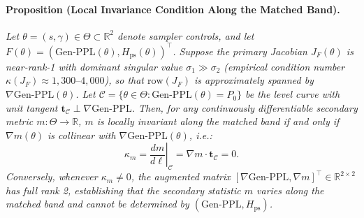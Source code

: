 \documentclass[11pt,a4paper]{article}
\begin{document}
\paragraph{Proposition (Local Invariance Condition Along the Matched Band).}
\emph{Let $\theta = (s, \gamma) \in \Theta \subset \mathbb{R}^2$ denote sampler controls, and let $F(\theta) = (\mathrm{Gen\text{-}PPL}(\theta), H_{\mathrm{ps}}(\theta))^\top$. Suppose the primary Jacobian $J_F(\theta)$ is near-rank-1 with dominant singular value $\sigma_1 \gg \sigma_2$ (empirical condition number $\kappa(J_F) \approx 1{,}300\text{--}4{,}000$), so that $\mathrm{row}(J_F)$ is approximately spanned by $\nabla \mathrm{Gen\text{-}PPL}(\theta)$. Let $\mathcal{C} = \{\theta \in \Theta : \mathrm{Gen\text{-}PPL}(\theta) = P_0\}$ be the level curve with unit tangent $\mathbf{t}_{\mathcal{C}} \perp \nabla\mathrm{Gen\text{-}PPL}$. Then, for any continuously differentiable secondary metric $m: \Theta \to \mathbb{R}$, $m$ is locally invariant along the matched band if and only if $\nabla m(\theta)$ is collinear with $\nabla\mathrm{Gen\text{-}PPL}(\theta)$, i.e.:}
\begin{equation}
    \kappa_m = \left.\frac{dm}{d\ell}\right|_{\mathcal{C}} = \nabla m \cdot \mathbf{t}_{\mathcal{C}} = 0.
    \label{eq:kappa}
\end{equation}
\emph{Conversely, whenever $\kappa_m \neq 0$, the augmented matrix $[\nabla\mathrm{Gen\text{-}PPL}, \nabla m]^\top \in \mathbb{R}^{2 \times 2}$ has full rank 2, establishing that the secondary statistic $m$ varies along the matched band and cannot be determined by $(\text{Gen-PPL}, H_{\mathrm{ps}})$.}

\begin{table}[t]
    \centering
    \caption{Out-of-sample validation of the continuous iso-frontier model across \textbf{C1}--\textbf{C3}: Stage-1 predictions $\Delta_{\mathrm{pred}} = \int_{\mathcal{C}} \kappa_m d\ell$ (seeds $\{0,1\}$ for \texttt{rep-4}/MAUVE; 40-run Stage-1 surface across 11 operating points, seeds $0\text{--}4$, quadratic $R^2=0.980$ with residual SD for $\mathrm{JSD}_\pi$) vs.\ held-out pilot $\Delta_{\mathrm{obs}}$ (seeds $201\text{--}205$, paired CRN 95\% CIs, $df=4$).}
    \label{tab:iso_frontier_validation}
    \resizebox{0.92\textwidth}{!}{}
\end{table}
\end{document}
